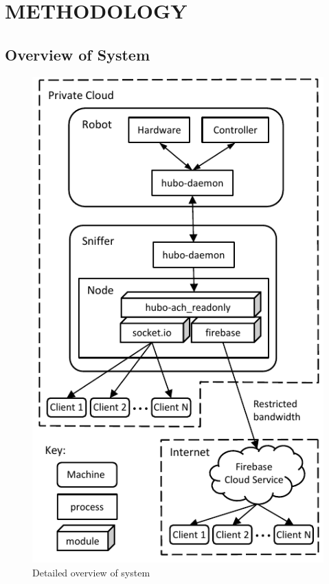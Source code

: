 \documentclass[letterpaper, 10 pt, conference]{ieee/ieeeconf}  %
\begin{document}
\section{METHODOLOGY}

\subsection{Overview of System}
\begin{figure}[thpb]
  \centering
  \includegraphics{figures/DetailedOverview.pdf}
  \caption{Detailed overview of system}
  \label{fig:Overview}
\end{figure}
\end{document}

